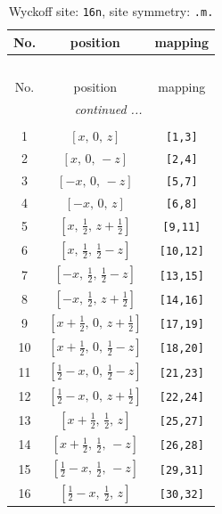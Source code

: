 \documentclass[fleqn,8pt]{jsarticle}
\begin{document}
\renewcommand{\arraystretch}{1.2}
\begin{longtable}{ccc}
\caption{Wyckoff site: {\tt 16n}, site symmetry: {\tt .m.}}
 \\
 \hline \hline
No. & position & mapping \\ \hline \endfirsthead

\multicolumn{2}{l}{\tablename\ \thetable{}} \\
 \hline \hline
No. & position & mapping \\ \hline \endhead

 \hline \hline
\multicolumn{2}{r}{\footnotesize\it continued ...} \\ \endfoot

 \hline \hline
\multicolumn{2}{r}{} \\ \endlastfoot

1 & $\left[ x,\, 0,\, z \right]$ & {\tt [1,3]} \\ \hline
2 & $\left[ x,\, 0,\, - z \right]$ & {\tt [2,4]} \\ \hline
3 & $\left[ - x,\, 0,\, - z \right]$ & {\tt [5,7]} \\ \hline
4 & $\left[ - x,\, 0,\, z \right]$ & {\tt [6,8]} \\ \hline
5 & $\left[ x,\, \frac{1}{2},\, z + \frac{1}{2} \right]$ & {\tt [9,11]} \\ \hline
6 & $\left[ x,\, \frac{1}{2},\, \frac{1}{2} - z \right]$ & {\tt [10,12]} \\ \hline
7 & $\left[ - x,\, \frac{1}{2},\, \frac{1}{2} - z \right]$ & {\tt [13,15]} \\ \hline
8 & $\left[ - x,\, \frac{1}{2},\, z + \frac{1}{2} \right]$ & {\tt [14,16]} \\ \hline
9 & $\left[ x + \frac{1}{2},\, 0,\, z + \frac{1}{2} \right]$ & {\tt [17,19]} \\ \hline
10 & $\left[ x + \frac{1}{2},\, 0,\, \frac{1}{2} - z \right]$ & {\tt [18,20]} \\ \hline
11 & $\left[ \frac{1}{2} - x,\, 0,\, \frac{1}{2} - z \right]$ & {\tt [21,23]} \\ \hline
12 & $\left[ \frac{1}{2} - x,\, 0,\, z + \frac{1}{2} \right]$ & {\tt [22,24]} \\ \hline
13 & $\left[ x + \frac{1}{2},\, \frac{1}{2},\, z \right]$ & {\tt [25,27]} \\ \hline
14 & $\left[ x + \frac{1}{2},\, \frac{1}{2},\, - z \right]$ & {\tt [26,28]} \\ \hline
15 & $\left[ \frac{1}{2} - x,\, \frac{1}{2},\, - z \right]$ & {\tt [29,31]} \\ \hline
16 & $\left[ \frac{1}{2} - x,\, \frac{1}{2},\, z \right]$ & {\tt [30,32]} \\
\end{longtable}
\end{document}
